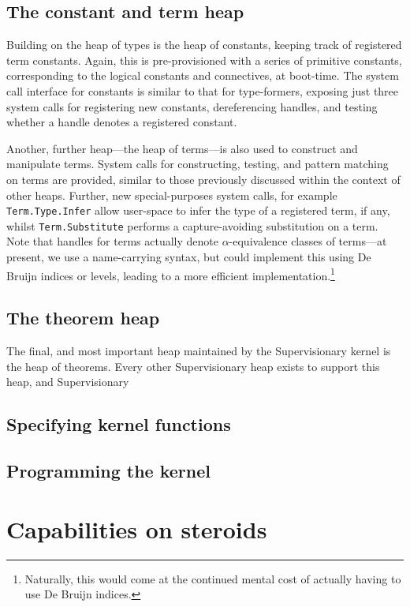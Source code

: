 \documentclass[a4paper, UKenglish, cleveref, autoref, thm-restate, colorlinks]{lipics-v2021}
\begin{document}
\subsection{The constant and term heap}

Building on the heap of types is the heap of constants, keeping track of registered term constants.
Again, this is pre-provisioned with a series of primitive constants, corresponding to the logical constants and connectives, at boot-time.
The system call interface for constants is similar to that for type-formers, exposing just three system calls for registering new constants, dereferencing handles, and testing whether a handle denotes a registered constant.

Another, further heap---the heap of terms---is also used to construct and manipulate terms.
System calls for constructing, testing, and pattern matching on terms are provided, similar to those previously discussed within the context of other heaps.
Further, new special-purposes system calls, for example \texttt{Term.Type.Infer} allow user-space to infer the type of a registered term, if any, whilst \texttt{Term.Substitute} performs a capture-avoiding substitution on a term.
Note that handles for terms actually denote $\alpha$-equivalence classes of terms---at present, we use a name-carrying syntax, but could implement this using De Bruijn indices or levels, leading to a more efficient implementation.\footnote{Naturally, this would come at the continued mental cost of actually having to use De Bruijn indices.}

\subsection{The theorem heap}

The final, and most important heap maintained by the Supervisionary kernel is the heap of theorems.
Every other Supervisionary heap exists to support this heap, and Supervisionary 

\subsection{Specifying kernel functions}

\subsection{Programming the kernel}

\section{Capabilities on steroids}
\label{sect.capabilities.on.steroids}
\end{document}
